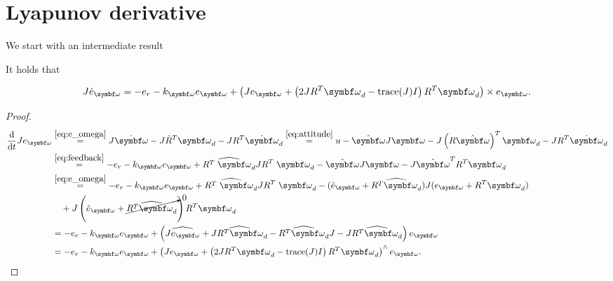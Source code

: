 \section{Lyapunov derivative}

We start with an intermediate result
\begin{proposition}
  It holds that
\end{proposition}
\begin{equation}
  \label{eq:Jeo_dot}
  J \dot e_\bomega = -e_r - k_\bomega e_\bomega + \left( J e_\bomega + \left(2 J R^T \bomega_d - \text{trace}(J) I \right) R^T \bomega_d \right) \times e_\bomega.
\end{equation}
\begin{proof}
  \begin{equation*}
    \begin{aligned}
      \frac{\mathrm{d}}{\mathrm{d}t} J e_\bomega & \overset{\eqref{eq:e_omega}}= J \dot \bomega - J \dot R^T \bomega_d - J R^T \dot \bomega_d \overset{\eqref{eq:attitude}}= u - \hat \bomega J \bomega - J \left( R \hat \bomega \right)^T \bomega_d - J R^T \dot \bomega_d \\
                                                 & \overset{\eqref{eq:feedback}}= -e_r - k_\bomega e_\bomega + \widehat{R^T \; {\bomega_d}} J R^T \; {\bomega_d} - \hat \bomega J \bomega - J \hat \bomega^T R^T \bomega_d                                                   \\
                                                 & \overset{\eqref{eq:e_omega}}= -e_r - k_\bomega e_\bomega + \widehat{R^T \; {\bomega_d}} J R^T \; {\bomega_d} - (\hat e_\bomega + \widehat{R^T \bomega_d}) J (e_\bomega + {R^T \bomega_d})       \\
                                                 & \quad + J \left( \hat e_\bomega + \cancelto{0}{\widehat{R^T \bomega_d}} \right) R^T \bomega_d                                                                                                                             \\
                                                 & = -e_r - k_\bomega e_\bomega + \left( \widehat{J e_\bomega} + \widehat{J R^T \bomega_d} - \widehat{R^T \bomega_d} J - J \widehat{R^T \bomega_d} \right) e_\bomega                         \\
                                                 & = -e_r - k_\bomega e_\bomega + \left( J e_\bomega + \left(2 J R^T \bomega_d - \text{trace}(J) I \right) R^T \bomega_d \right)^\wedge e_\bomega.
    \end{aligned}
  \end{equation*}
\end{proof}

